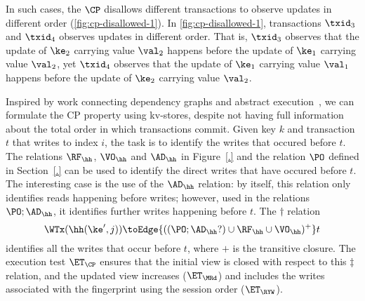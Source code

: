 In such cases, the \( \CP \) disallows different transactions to observe updates in different order (\cref{fig:cp-disallowed-1}).
In \cref{fig:cp-disallowed-1}, transactions $\txid_{3}$ and \( \txid_4 \) observes updates in different order.
That is, \( \txid_3 \) observes that the update of $\ke_2$ carrying value $\val_2$ happens before the update of $\ke_1$ carrying value $\val_2$,
yet $\txid_{4}$ observes that the update of $\ke_1$ carrying value
$\val_1$ happens before the update of $\ke_2$ carrying value
$\val_2$. 




Inspired by work connecting dependency graphs and abstract execution~\cite{..}, we can formulate the CP property using kv-stores, despite not having
full information about the total order in which transactions commit.
Given key $k$ and transaction $t$ that writes to index $i$, the task
is to identify the writes that occured before $t$. The relations
$\RF_{\hh}$, $\VO_{\hh}$ and $\AD_{\hh} $ in Figure~\ref{.} and the
relation $\PO$ defined in Section~\ref{.}  can be used to identify
the direct writes that have occured before $t$. The interesting
case is the use of the $\AD_{\hh}$ relation: by itself, this relation
only identifies reads happening before writes; however, used in the
relations $\PO ;
\AD_{\hh}$, it identifies further  writes happening
before $t$. The $\dagger$ relation
\[
\WTx(\hh(\ke', j)) \toEdge{((\PO ; \AD_{\hh}? )\cup \RF_{\hh} \cup \VO_{\hh})^{+}} t
\]
identifies all the writes that occur before $t$, where $+$ is the
transitive closure. 
The execution test $\ET_{\CP}$ ensures that the initial view is 
closed with respect to this $\ddagger$  relation, and the updated view 
increases ($ \ET_\MRd $) and 
includes the writes associated with the fingerprint using the
session order ($\ET_\RYW $).



